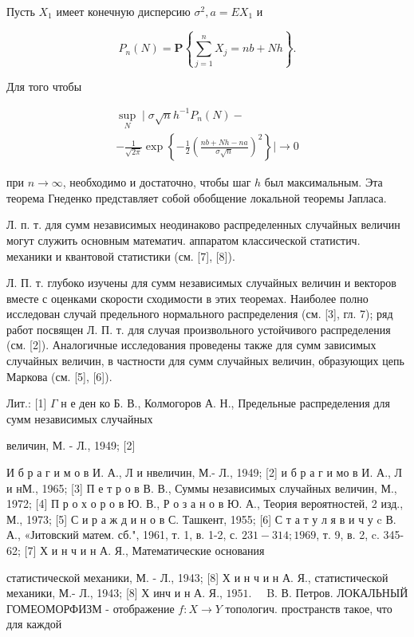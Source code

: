\documentclass[10pt]{article}
\begin{document}
Пусть $X_{1}$ имеет конечную дисперсию $\sigma^{2}, a=E X_{1}$ и



\[

P_{n}(N)=\mathbf{P}\left\{\sum_{j=1}^{n} X_{j}=n b+N h\right\} .

\]



Для того чтобы



\[

\begin{gathered}

\sup _{N} \mid \sigma \sqrt{n} h^{-1} P_{n}(N)- \\

-\frac{1}{\sqrt{2 \pi}} \exp \left\{-\frac{1}{2}\left(\frac{n b+N h-n a}{\sigma \sqrt{n}}\right)^{2}\right\} \mid \rightarrow 0

\end{gathered}

\]



при $n \rightarrow \infty$, необходимо и достаточно, чтобы шаг $h$ был максимальным. Эта теорема Гнеденко представляет собой обобщение локальной теоремы Јапласа.



Л. п. т. для сумм независимых неодинаково распределенных случайных величин могут служить основным математич. аппаратом классической статистич. механики и квантовой статистики (см. [7], [8]).



Л. П. т. глубоко изучены для сумм независимых случайных величин и векторов вместе с оценками скорости сходимости в этих теоремах. Наиболее полно исследован случай предельного нормального распределения (см. [3], гл. 7); ряд работ посвящен Л. П. т. для случая произвольного устойчивого распределения (см. [2]). Аналогичные исследования проведены также для сумм зависимых случайных величин, в частности для сумм случайных величин, образующих цепь Маркова (см. [5], [6]).



Лит.: [1] $\Gamma$ н е ден ко Б. В., Колмогоров А. Н., Предельные распределения для сумм независимых случайных

величин, М. - Л., 1949; [2]

И б р а г и м о в И. А., Л и нвеличин, М.- Л., 1949; [2] и б р а г и мо в И. А., Л и нМ., 1965; [3] П е т р о в В. В., Суммы независимых случайных величин, М., 1972; [4] П р о х о р о в Ю. В., Р о з а н о в Ю. А., Теория вероятностей, 2 изд., М., 1973; [5] С и р а ж д и н о в С. Ташкент, 1955; [6] С т а т у л я в и ч у c В. А., «Јитовский матем. сб.", 1961, т. 1, в. 1-2, с. $231-314 ; 1969$, т. 9, в. 2, c. 345-62; [7] Х и н ч и н А. Я., Математические основания

статистической механики, М. - Л., 1943; [8] Х и н ч и н А. Я., статистической механики, М.- Л., 1943; [8] Х инч и н А. Я., $1951 . \quad$ B. В. Петров. ЛОКАЛЬНЫЙ ГОМЕОМОРФИЗМ - отображение $f: X \rightarrow Y$ топологич. пространств такое, что для каждой
\end{document}
